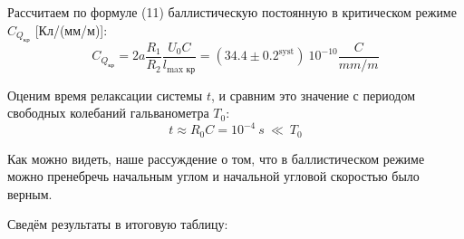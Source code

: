 Рассчитаем по формуле (11) баллистическую постоянную в критическом режиме $C_{Q_{\text{кр}}}$ [Кл/(мм/м)]:
$$C_{Q_{\text{кр}}} = 2a\frac{R_1}{R_2}\frac{U_0 C}{l_{\text{max~кр}}} = (34.4 \pm 0.2^{\text{syst}})~10^{-10} \frac{C}{mm/m}$$

Оценим время релаксации системы $t$, и сравним это значение с периодом свободных колебаний гальванометра $T_0$:
$$ t \approx R_0 C = 10^{-4}~s~\ll~T_0$$

Как можно видеть, наше рассуждение о том, что в баллистическом режиме можно пренебречь начальным углом и начальной угловой скоростью было верным.

Сведём результаты в итоговую таблицу:\\



